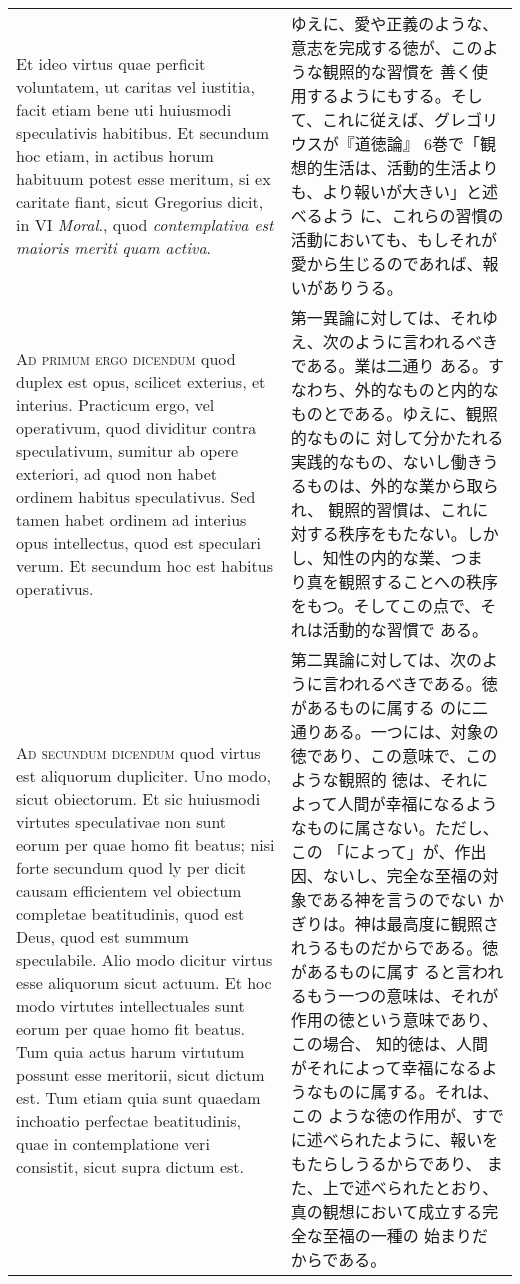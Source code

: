 \documentclass[10pt]{jsarticle}
\begin{document}
\begin{longtable}{p{21em}p{21em}}
\\

Et ideo virtus quae perficit voluntatem, ut caritas vel iustitia,
facit etiam bene uti huiusmodi speculativis habitibus. Et secundum hoc
etiam, in actibus horum habituum potest esse meritum, si ex caritate
fiant, sicut Gregorius dicit, in VI {\itshape Moral}., quod {\itshape
contemplativa est maioris meriti quam activa}.

&

ゆえに、愛や正義のような、意志を完成する徳が、このような観照的な習慣を
善く使用するようにもする。そして、これに従えば、グレゴリウスが『道徳論』
6巻で「観想的生活は、活動的生活よりも、より報いが大きい」と述べるよう
に、これらの習慣の活動においても、もしそれが愛から生じるのであれば、報
いがありうる。

\\

{\scshape Ad primum ergo dicendum} quod duplex est opus, scilicet
exterius, et interius. Practicum ergo, vel operativum, quod dividitur
contra speculativum, sumitur ab opere exteriori, ad quod non habet
ordinem habitus speculativus. Sed tamen habet ordinem ad interius opus
intellectus, quod est speculari verum. Et secundum hoc est habitus
operativus.

&

第一異論に対しては、それゆえ、次のように言われるべきである。業は二通り
ある。すなわち、外的なものと内的なものとである。ゆえに、観照的なものに
対して分かたれる実践的なもの、ないし働きうるものは、外的な業から取られ、
観照的習慣は、これに対する秩序をもたない。しかし、知性の内的な業、つま
り真を観照することへの秩序をもつ。そしてこの点で、それは活動的な習慣で
ある。

\\

{\scshape Ad secundum dicendum} quod virtus est aliquorum
dupliciter. Uno modo, sicut obiectorum. Et sic huiusmodi virtutes
speculativae non sunt eorum per quae homo fit beatus; nisi forte
secundum quod ly per dicit causam efficientem vel obiectum completae
beatitudinis, quod est Deus, quod est summum speculabile. Alio modo
dicitur virtus esse aliquorum sicut actuum. Et hoc modo virtutes
intellectuales sunt eorum per quae homo fit beatus. Tum quia actus
harum virtutum possunt esse meritorii, sicut dictum est. Tum etiam
quia sunt quaedam inchoatio perfectae beatitudinis, quae in
contemplatione veri consistit, sicut supra dictum est.

&

第二異論に対しては、次のように言われるべきである。徳があるものに属する
のに二通りある。一つには、対象の徳であり、この意味で、このような観照的
徳は、それによって人間が幸福になるようなものに属さない。ただし、この
「によって」が、作出因、ないし、完全な至福の対象である神を言うのでない
かぎりは。神は最高度に観照されうるものだからである。徳があるものに属す
ると言われるもう一つの意味は、それが作用の徳という意味であり、この場合、
知的徳は、人間がそれによって幸福になるようなものに属する。それは、この
ような徳の作用が、すでに述べられたように、報いをもたらしうるからであり、
また、上で述べられたとおり、真の観想において成立する完全な至福の一種の
始まりだからである。


\end{longtable}
\end{document}

